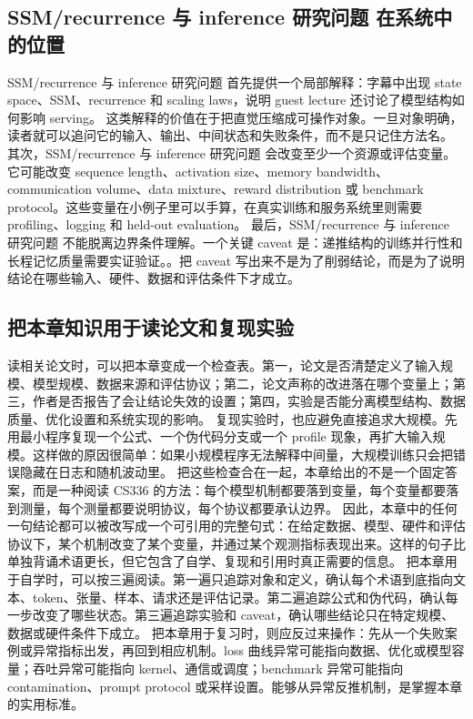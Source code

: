 \documentclass[a4paper]{article}
\begin{document}
\subsection{SSM/recurrence 与 inference 研究问题 在系统中的位置}
SSM/recurrence 与 inference 研究问题 首先提供一个局部解释：字幕中出现 state space、SSM、recurrence 和 scaling laws，说明 guest lecture 还讨论了模型结构如何影响 serving。 这类解释的价值在于把直觉压缩成可操作对象。一旦对象明确，读者就可以追问它的输入、输出、中间状态和失败条件，而不是只记住方法名。
其次，SSM/recurrence 与 inference 研究问题 会改变至少一个资源或评估变量。它可能改变 sequence length、activation size、memory bandwidth、communication volume、data mixture、reward distribution 或 benchmark protocol。这些变量在小例子里可以手算，在真实训练和服务系统里则需要 profiling、logging 和 held-out evaluation。
最后，SSM/recurrence 与 inference 研究问题 不能脱离边界条件理解。一个关键 caveat 是：递推结构的训练并行性和长程记忆质量需要实证验证。。把 caveat 写出来不是为了削弱结论，而是为了说明结论在哪些输入、硬件、数据和评估条件下才成立。
\subsection{把本章知识用于读论文和复现实验}
读相关论文时，可以把本章变成一个检查表。第一，论文是否清楚定义了输入规模、模型规模、数据来源和评估协议；第二，论文声称的改进落在哪个变量上；第三，作者是否报告了会让结论失效的设置；第四，实验是否能分离模型结构、数据质量、优化设置和系统实现的影响。
复现实验时，也应避免直接追求大规模。先用最小程序复现一个公式、一个伪代码分支或一个 profile 现象，再扩大输入规模。这样做的原因很简单：如果小规模程序无法解释中间量，大规模训练只会把错误隐藏在日志和随机波动里。
把这些检查合在一起，本章给出的不是一个固定答案，而是一种阅读 CS336 的方法：每个模型机制都要落到变量，每个变量都要落到测量，每个测量都要说明协议，每个协议都要承认边界。
因此，本章中的任何一句结论都可以被改写成一个可引用的完整句式：在给定数据、模型、硬件和评估协议下，某个机制改变了某个变量，并通过某个观测指标表现出来。这样的句子比单独背诵术语更长，但它包含了自学、复现和引用时真正需要的信息。
把本章用于自学时，可以按三遍阅读。第一遍只追踪对象和定义，确认每个术语到底指向文本、token、张量、样本、请求还是评估记录。第二遍追踪公式和伪代码，确认每一步改变了哪些状态。第三遍追踪实验和 caveat，确认哪些结论只在特定规模、数据或硬件条件下成立。
把本章用于复习时，则应反过来操作：先从一个失败案例或异常指标出发，再回到相应机制。loss 曲线异常可能指向数据、优化或模型容量；吞吐异常可能指向 kernel、通信或调度；benchmark 异常可能指向 contamination、prompt protocol 或采样设置。能够从异常反推机制，是掌握本章的实用标准。
\end{document}
